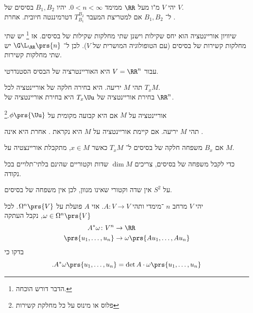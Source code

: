 \documentclass[a4paper,10pt,twoside,openany]{book}
\begin{document}
\begin{definition}
יהי
$V$
מ"ו מעל
$\RR$
ממימד
$0 < n < \infty$.
יהיו
$B_1, B_2$
בסיסים של
$V$.\\
ל־%
$B_1, B_2$
אם למטריצת המעבר
$T_{B_1}^{B_2}$
דטרמיננטה חיובית. אחרת
.
\end{definition}
\begin{exercise}
שיוויון אוריינטציה הוא יחס שקילות וישנן שתי מחלקות שקילות של בסיסים. אז%
\footnote{הדבר דורש הוכחה.}
 יש שתי מחלקות קשירות של בסיסים (עם הטופולוגיה המושרית של
$V$).
לכן ל־%
$\G\L_{\RR}\prs{n}$
יש שתי מחלקות קשירות.
\end{exercise}
\begin{definition}
עבור
$V = \RR^n$
היא האוריינטרציה של הבסיס הסטנדרטי.
\end{definition}
\begin{definition}
תהי
$M$
יריעה.
היא בחירה חלקה של אוריינטציה לכל
$T_xM$.\\
בחירת אוריינטציה של
$T_x \Uu$
היא בחירת אוריינטציה של
$\RR^n$.
\end{definition}
\begin{definition}
אוריינטציה על
$M$
אם היא קבועה מקומית על
$\phi\prs{\Uu}$.\footnote{פלוס או מינוס על כל מחלקת קשירות}
\end{definition}
\begin{definition}
תהי
$M$
יריעה.
אם קיימת אוריינטציה על
$M$
היא נקראת
.
אחרת היא אינה
.
\end{definition}
\begin{proposition}
אם
$B_x$
משפחה חלקה של בסיסים ל־%
$T_xM$
כאשר
$x \in M$,
מתקבלת אוריינצטיה על
$M$.
\end{proposition}
\begin{remark}
כדי לקבל משפחה של בסיסים, צריכים
$\dim M$
שדות וקטוריים שהינם בלתי־תלויים בכל נקודה.
\end{remark}
\begin{example}
על
$S^2$
אין שדה וקטורי שאינו מנוון, לכן אין משפחה של בסיסים.
\end{example}
\begin{exercise}
יהי
$V$
מרחב
$n$%
־מימדי ותהי
$A \colon V \to V$.
אזי
$A$
פועלת על
$\Omega^n \prs{V}$.
לכל
$\omega \in \Omega^n\prs{V}$,
נקבל העתקה
\begin{align*}
A^* \omega \colon V^n &\to \RR \\
\prs{u_1, \ldots, u_n} &\to \omega\prs{A u_1, \ldots, A u_n}
\end{align*}
בדקו כי
\[\text{.} A^* \omega \prs{u_1, \ldots, u_n} = \det A \cdot \omega\prs{u_1, \ldots, u_n}\]
\end{exercise}
\end{document}
